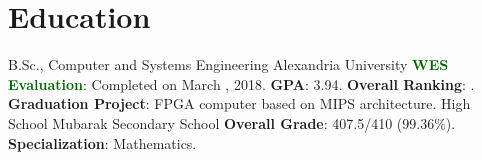 \documentclass[letterpaper]{twentysecondcv} %
\begin{document}





\makeprofile


\section{Education}

\begin{twenty} %
               {B.Sc., Computer and Systems Engineering}
               {Alexandria University}
               {\textcolor{darkgreen}{\textbf{WES Evaluation}}: Completed on March , 2018.\newline
                \textbf{GPA}: 3.94.\newline
                \textbf{Overall Ranking}: \underline{}.\newline
                \textbf{Graduation Project}: FPGA computer based on MIPS architecture.\newline
               }
               {High School}
               {Mubarak Secondary School}
               {\textbf{Overall Grade}: 407.5/410 (99.36\%).\newline
                \textbf{Specialization}: Mathematics.}
\end{twenty}
\end{document}
